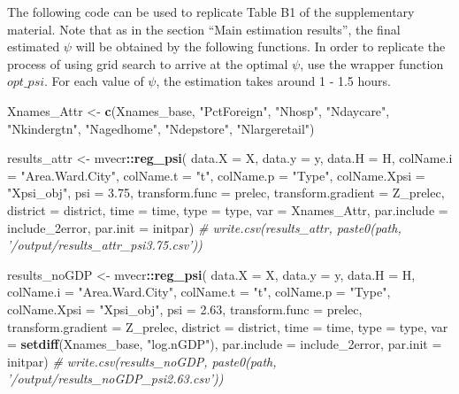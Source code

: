 \documentclass[
]{article}
\newenvironment{Shaded}{\begin{snugshade}}{\end{snugshade}}
\newcommand{\CommentTok}[1]{\textcolor[rgb]{0.56,0.35,0.01}{\textit{#1}}}
\newcommand{\DataTypeTok}[1]{\textcolor[rgb]{0.13,0.29,0.53}{#1}}
\newcommand{\FloatTok}[1]{\textcolor[rgb]{0.00,0.00,0.81}{#1}}
\newcommand{\KeywordTok}[1]{\textcolor[rgb]{0.13,0.29,0.53}{\textbf{#1}}}
\newcommand{\NormalTok}[1]{#1}
\newcommand{\OperatorTok}[1]{\textcolor[rgb]{0.81,0.36,0.00}{\textbf{#1}}}
\newcommand{\StringTok}[1]{\textcolor[rgb]{0.31,0.60,0.02}{#1}}
\begin{document}
The following code can be used to replicate Table B1 of the
supplementary material. Note that as in the section ``Main estimation
results'', the final estimated \(\psi\) will be obtained by the
following functions. In order to replicate the process of using grid
search to arrive at the optimal \(\psi\), use the wrapper function
\(opt\_psi\). For each value of \(\psi\), the estimation takes around 1
- 1.5 hours.

\begin{Shaded}
\begin{Highlighting}[]
\NormalTok{Xnames_Attr <-}\StringTok{ }\KeywordTok{c}\NormalTok{(Xnames_base, }\StringTok{"PctForeign"}\NormalTok{, }\StringTok{"Nhosp"}\NormalTok{, }\StringTok{"Ndaycare"}\NormalTok{, }
                 \StringTok{"Nkindergtn"}\NormalTok{, }\StringTok{"Nagedhome"}\NormalTok{, }\StringTok{"Ndepstore"}\NormalTok{, }\StringTok{"Nlargeretail"}\NormalTok{)}

\NormalTok{results_attr <-}\StringTok{ }\NormalTok{mvecr}\OperatorTok{::}\KeywordTok{reg_psi}\NormalTok{(}
  \DataTypeTok{data.X =}\NormalTok{ X, }\DataTypeTok{data.y =}\NormalTok{ y, }\DataTypeTok{data.H =}\NormalTok{ H,}
  \DataTypeTok{colName.i =} \StringTok{"Area.Ward.City"}\NormalTok{, }\DataTypeTok{colName.t =} \StringTok{"t"}\NormalTok{,  }
  \DataTypeTok{colName.p =} \StringTok{"Type"}\NormalTok{, }\DataTypeTok{colName.Xpsi =} \StringTok{"Xpsi_obj"}\NormalTok{,}
  \DataTypeTok{psi =} \FloatTok{3.75}\NormalTok{, }
  \DataTypeTok{transform.func =}\NormalTok{ prelec, }\DataTypeTok{transform.gradient =}\NormalTok{ Z_prelec,}
  \DataTypeTok{district =}\NormalTok{ district, }\DataTypeTok{time =}\NormalTok{ time, }\DataTypeTok{type =}\NormalTok{ type,}
  \DataTypeTok{var =}\NormalTok{ Xnames_Attr,}
  \DataTypeTok{par.include =}\NormalTok{ include_2error,}
  \DataTypeTok{par.init =}\NormalTok{ initpar)}
\CommentTok{# write.csv(results_attr, paste0(path, '/output/results_attr_psi3.75.csv'))}

\NormalTok{results_noGDP <-}\StringTok{ }\NormalTok{mvecr}\OperatorTok{::}\KeywordTok{reg_psi}\NormalTok{(}
  \DataTypeTok{data.X =}\NormalTok{ X, }\DataTypeTok{data.y =}\NormalTok{ y, }\DataTypeTok{data.H =}\NormalTok{ H,}
  \DataTypeTok{colName.i =} \StringTok{"Area.Ward.City"}\NormalTok{, }\DataTypeTok{colName.t =} \StringTok{"t"}\NormalTok{,  }
  \DataTypeTok{colName.p =} \StringTok{"Type"}\NormalTok{, }\DataTypeTok{colName.Xpsi =} \StringTok{"Xpsi_obj"}\NormalTok{,}
  \DataTypeTok{psi =} \FloatTok{2.63}\NormalTok{, }
  \DataTypeTok{transform.func =}\NormalTok{ prelec, }\DataTypeTok{transform.gradient =}\NormalTok{ Z_prelec,}
  \DataTypeTok{district =}\NormalTok{ district, }\DataTypeTok{time =}\NormalTok{ time, }\DataTypeTok{type =}\NormalTok{ type,}
  \DataTypeTok{var =} \KeywordTok{setdiff}\NormalTok{(Xnames_base, }\StringTok{"log.nGDP"}\NormalTok{),}
  \DataTypeTok{par.include =}\NormalTok{ include_2error,}
  \DataTypeTok{par.init =}\NormalTok{ initpar)}
\CommentTok{# write.csv(results_noGDP, paste0(path, '/output/results_noGDP_psi2.63.csv'))}
\end{Highlighting}
\end{Shaded}
\end{document}
